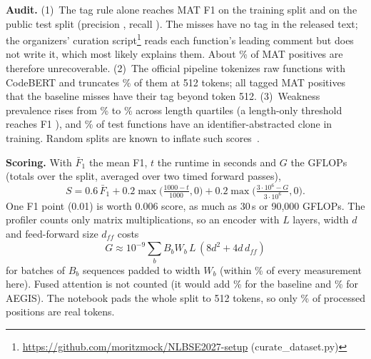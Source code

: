 \documentclass[10pt,conference]{IEEEtran}
\begin{document}
\textbf{Audit.} (1)~The tag rule alone reaches MAT F1 \RuleMatFoneTrain{} on the training split and \RuleMatFone{}
on the public test split (precision \RuleMatP{}, recall \RuleMatR). The misses have no tag in the released text;
the organizers' curation script\footnote{\url{https://github.com/moritzmock/NLBSE2027-setup} (curate\_dataset.py)}
reads each function's leading comment but does not write it, which most likely explains them. About
\MatNoTagPct\% of MAT positives are therefore unrecoverable. (2)~The official pipeline tokenizes raw functions with
CodeBERT and truncates \TruncRaw\% of them at 512 tokens; all \TruncMatMiss{} tagged MAT positives that the
baseline misses have their tag beyond token 512. (3)~Weakness prevalence rises from \VulnQOne\% to \VulnQFour\%
across length quartiles (a length-only threshold reaches F1 \LengthOnlyFone), and \CloneTestPct\% of test functions
have an identifier-abstracted clone in training. Random splits are known to inflate such
scores~\cite{croft2023dataquality,ding2025primevul}.

\textbf{Scoring.} With $\bar F_1$ the mean F1, $t$ the runtime in seconds and $G$ the GFLOPs (totals over the
split, averaged over two timed forward passes),
\begin{equation}
S = 0.6\,\bar F_1 + 0.2\max\!\Big(\tfrac{1000-t}{1000},0\Big) + 0.2\max\!\Big(\tfrac{3\cdot 10^6-G}{3\cdot 10^6},0\Big).
\end{equation}
One F1 point (0.01) is worth 0.006 score, as much as 30\,s or 90{,}000 GFLOPs. The profiler counts only matrix
multiplications, so an encoder with $L$ layers, width $d$ and feed-forward size $d_{\mathit{ff}}$ costs
\begin{equation}
G \approx 10^{-9}\textstyle\sum_{b} B_b W_b \, L\,(8d^2 + 4 d\, d_{\mathit{ff}})
\end{equation}
for batches of $B_b$ sequences padded to width $W_b$ (within \CostModelErr\% of every measurement here). Fused
attention is not counted (it would add \AttnBase\% for the baseline and \AttnAegis\% for AEGIS). The notebook pads
the whole split to 512 tokens, so only \PadEff\% of processed positions are real tokens.
\end{document}

